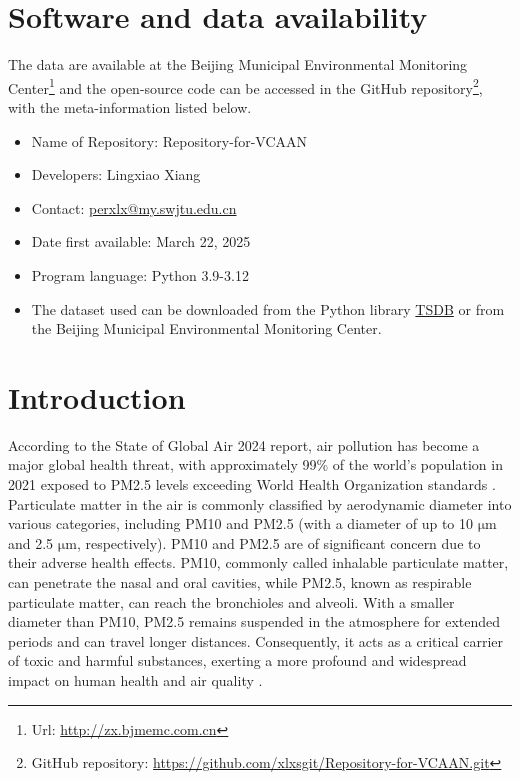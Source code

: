 \documentclass[3p,11pt,authoryear]{elsarticle}
\begin{document}
\section*{Software and data availability}
The data are available at the Beijing Municipal Environmental Monitoring Center\footnote{Url: \href{http://zx.bjmemc.com.cn}{http://zx.bjmemc.com.cn}} and the open-source code can be accessed in the GitHub repository\footnote{GitHub repository: \href{https://github.com/xlxsgit/Repository-for-VCAAN.git}{https://github.com/xlxsgit/Repository-for-VCAAN.git}}, with the meta-information listed below. 

\begin{itemize}
	\item Name of Repository: Repository-for-VCAAN
	\item Developers: Lingxiao Xiang
	\item Contact: \href{perxlx@my.swjtu.edu.cn}{perxlx@my.swjtu.edu.cn}
	\item Date first available: March 22, 2025
	\item Program language: Python 3.9-3.12
	\item The dataset used can be downloaded from the Python library \href{https://github.com/WenjieDu/TSDB}{TSDB} or from the Beijing Municipal Environmental Monitoring Center. 
\end{itemize}

\section{Introduction}\label{sec:Introduction}
According to the State of Global Air 2024 report, air pollution has become a major global health threat, with approximately 99\% of the world's population in 2021 exposed to PM2.5 levels exceeding World Health Organization standards \citep{HEI2024}. Particulate matter in the air is commonly classified by aerodynamic diameter into various categories, including PM10 and PM2.5 (with a diameter of up to 10 $\mathrm{\mu m}$ and 2.5 $\mathrm{\mu m}$, respectively). PM10 and PM2.5 are of significant concern due to their adverse health effects. PM10, commonly called inhalable particulate matter, can penetrate the nasal and oral cavities, while PM2.5, known as respirable particulate matter, can reach the bronchioles and alveoli. With a smaller diameter than PM10, PM2.5 remains suspended in the atmosphere for extended periods and can travel longer distances. Consequently, it acts as a critical carrier of toxic and harmful substances, exerting a more profound and widespread impact on human health and air quality \citep{zhu2021attention}.
\end{document}
